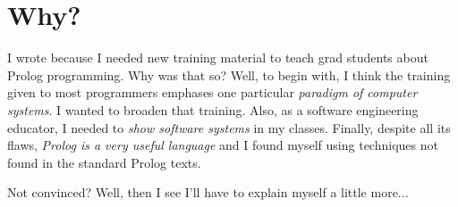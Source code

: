 \section{Why?}

I wrote {\PROD} because I needed  new training material to teach
grad students about Prolog programming. Why was that so? Well, to
begin with,   I think the training given to most programmers
emphases one particular {\em paradigm of computer systems}. I
wanted to broaden that training. Also, as a software engineering
educator, I needed to {\em show software systems} in my classes.
Finally, despite all its flaws, {\em Prolog is  a very useful
language} and I found myself using techniques not found in the
standard Prolog texts.

Not convinced? Well, then I see I'll have to explain myself a
little more...


